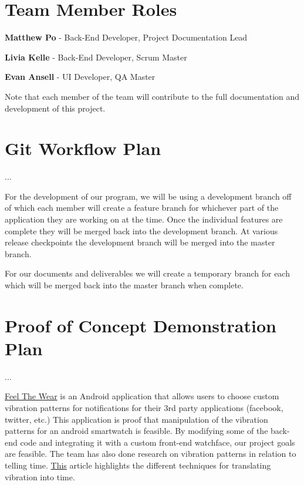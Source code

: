 \documentclass{article}
\begin{document}
\section{Team Member Roles}
\textbf{Matthew Po} - Back-End Developer, Project Documentation Lead

\noindent
\textbf{Livia Kelle} - Back-End Developer, Scrum Master

\noindent
\textbf{Evan Ansell} - UI Developer, QA Master

\vspace{0.33mm}
Note that each member of the team will contribute to the full documentation and development of this project.

\section{Git Workflow Plan}
...

For the development of our program, we will be using a development branch off of which each member will create a feature branch for whichever part of the application they are working on at the time. Once the individual features are complete they will be merged back into the development branch. At various release checkpoints the development branch will be merged into the master branch.
\vspace{0.8cm}

For our documents and deliverables we will create a temporary branch for each which will be merged back into the master branch when complete.


\section{Proof of Concept Demonstration Plan}
...

\href{https://play.google.com/store/apps/details?id=sk.martinflorek.wear.feelthewear&hl=en}{Feel The Wear} is an Android application that allows users to choose custom vibration patterns for notifications for their 3rd party applications (facebook, twitter, etc.) This application is proof that manipulation of the vibration patterns for an android smartwatch is feasible. By modifying some of the back-end code and integrating it with a custom front-end watchface, our project goals are feasible. The team has also done research on vibration patterns in relation to telling time. \href{https://link.springer.com/chapter/10.1007/978-3-540-69057-3_116}{This} article highlights the different techniques for translating vibration into time. 
\vspace{0.8cm}
\end{document}
